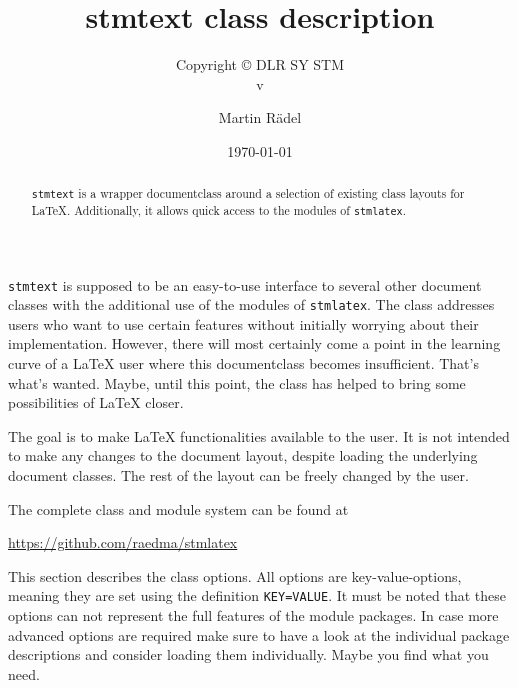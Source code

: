 \documentclass[%
  type=article,%
  layout=koma,%
  fleqn,%
  page=false,%
  cleveref=true,%
  conditionallox=true,%
  conditionalloxnewpage=true,%
  date=true,%
  glossaries=true,%
  hyperref=true,%
  index=true,%
  listings=true%
]{stmtext}
\author{Martin R\"{a}del}
\title{stmtext class description}
\subtitle{Copyright \copyright{} \the\year{} DLR SY STM\\v\formatdate[versiondatestyle]{\DTMToday}}
\date{\today}
\begin{document}
\maketitle

\begin{abstract}
\texttt{stmtext} is a wrapper documentclass around a selection of existing class layouts for \LaTeX. Additionally, it allows quick access to the modules of \texttt{stmlatex}.
\end{abstract}

\secondpage

\tableofcontents

\conditionallistoffigures  %
\conditionallistoftables   %
\conditionallistoflistings %

\setcounter{currentlevel}{\basetoclevelnr}
\label{sec:about}

\texttt{stmtext} is supposed to be an easy-to-use interface to several other document classes with the additional use of the modules of \texttt{stmlatex}. The class addresses users who want to use certain features without initially worrying about their implementation. However, there will most certainly come a point in the learning curve of a \LaTeX{} user where this documentclass becomes insufficient. That's what's wanted. Maybe, until this point, the class has helped to bring some possibilities of \LaTeX{} closer. 

The goal is to make \LaTeX{} functionalities available to the user. It is not intended to make any changes to the document layout, despite loading the underlying document classes. The rest of the layout can be freely changed by the user.

The complete class and module system can be found at

\href{https://github.com/raedma/stmlatex}{https://github.com/raedma/stmlatex}


\setcounter{currentlevel}{\basetoclevelnr}
\label{sec:options}

This section describes the class options. All options are key-value-options, meaning they are set using the definition \texttt{KEY=VALUE}. It must be noted that these options can not represent the full features of the module packages. In case more advanced options are required make sure to have a look at the individual package descriptions and consider loading them individually. Maybe you find what you need.
\end{document}
